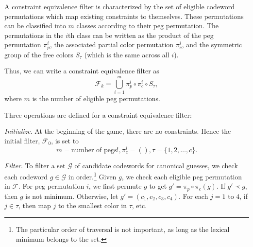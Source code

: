 
A constraint equivalence filter is characterized by the set of eligible codeword permutations which map existing constraints to themselves. These permutations 
can be classified into $m$ classes according to their peg permutation. The permutations in the $i$th class can be written as the product of the peg permutation $\pi_p^i$, the associated partial color permutation $\pi_c^i$, and the symmetric group of the free colors $S_\tau$ (which is the same across all $i$). 

Thus, we can write a constraint equivalence filter as
\[
\mathcal{F}_k = \bigcup_{i=1}^m \pi_p^i \circ \pi_c^i \circ S_\tau ,
\]
where $m$ is the number of eligible peg permutations.

Three operations are defined for a constraint equivalence filter:

\emph{Initialize}. At the beginning of the game, there are no constraints. Hence the initial filter, $\mathcal{F}_0$, is set to 
\[
m = \text{number of pegs}!, \pi_c^i = (), \tau = \{1, 2, \ldots, c \}.
\]

\emph{Filter}. To filter a set $\mathcal{G}$ of candidate codewords for canonical guesses, we check each codeword $g \in \mathcal{G}$ in order.\footnote{The particular order of traversal is not important, as long as the lexical minimum belongs to the set.} 
Given $g$, we check each eligible peg permutation in $\mathcal{F}$. For peg permutation $i$, we first permute $g$ to get $g' = \pi_p \circ \pi_c (g)$. If $g' \prec g$, then $g$ is not minimum. Otherwise, let $g' = (c_1, c_2, c_3, c_4)$. For each $j = 1$ to $4$, if $j \in \tau$, then map $j$ to the smallest color in $\tau$, etc.




